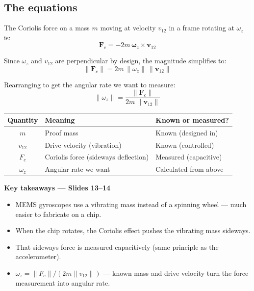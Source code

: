 \documentclass[12pt, a4paper]{article}
\begin{document}
\subsection*{The equations}

The Coriolis force on a mass $m$ moving at velocity $v_{12}$
in a frame rotating at $\omega_z$ is:
\[
  \mathbf{F}_c = -2m\,\boldsymbol{\omega}_z \times \mathbf{v}_{12}
\]

Since $\omega_z$ and $v_{12}$ are perpendicular by design, the
magnitude simplifies to:
\[
  \|\mathbf{F}_c\| = 2m\,\|\omega_z\|\,\|\mathbf{v}_{12}\|
\]

Rearranging to get the angular rate we want to measure:
\[
  \boxed{\|\omega_z\| = \frac{\|\mathbf{F}_c\|}{2m\,\|\mathbf{v}_{12}\|}}
\]

\begin{center}
\renewcommand{\arraystretch}{1.5}
\begin{tabular}{cll}
  \toprule
  \textbf{Quantity} & \textbf{Meaning} & \textbf{Known or measured?} \\
  \midrule
  $m$           & Proof mass           & Known (designed in) \\
  $v_{12}$      & Drive velocity (vibration) & Known (controlled) \\
  $F_c$         & Coriolis force (sideways deflection) & Measured (capacitive) \\
  $\omega_z$    & Angular rate we want & Calculated from above \\
  \bottomrule
\end{tabular}
\end{center}

\begin{keybox}
  \textbf{Key takeaways --- Slides 13--14}
  \begin{itemize}[leftmargin=1.4em, topsep=2pt]
    \item MEMS gyroscopes use a vibrating mass instead of a spinning
          wheel --- much easier to fabricate on a chip.
    \item When the chip rotates, the Coriolis effect pushes the
          vibrating mass sideways.
    \item That sideways force is measured capacitively (same principle
          as the accelerometer).
    \item $\omega_z = \|F_c\| / (2m\|v_{12}\|)$ --- known mass and
          drive velocity turn the force measurement into angular rate.
  \end{itemize}
\end{keybox}
\end{document}
